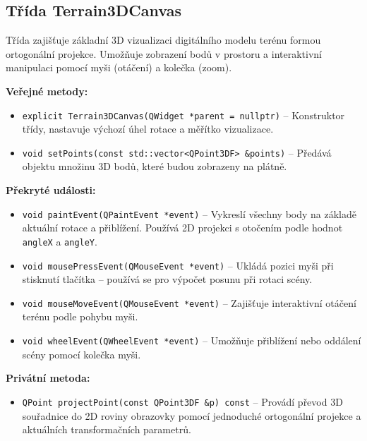 \subsection{Třída Terrain3DCanvas}
Třída zajišťuje základní 3D vizualizaci digitálního modelu terénu formou ortogonální projekce. Umožňuje zobrazení bodů v prostoru a interaktivní manipulaci pomocí myši (otáčení) a kolečka (zoom).

\textbf{Veřejné metody:}
\begin{itemize}
    \item \texttt{explicit Terrain3DCanvas(QWidget *parent = nullptr)} – Konstruktor třídy, nastavuje výchozí úhel rotace a měřítko vizualizace.
    \item \texttt{void setPoints(const std::vector<QPoint3DF> \&points)} – Předává objektu množinu 3D bodů, které budou zobrazeny na plátně.
\end{itemize}

\textbf{Překryté události:}
\begin{itemize}
    \item \texttt{void paintEvent(QPaintEvent *event)} – Vykreslí všechny body na základě aktuální rotace a přiblížení. Používá 2D projekci s otočením podle hodnot \texttt{angleX} a \texttt{angleY}.
    \item \texttt{void mousePressEvent(QMouseEvent *event)} – Ukládá pozici myši při stisknutí tlačítka – používá se pro výpočet posunu při rotaci scény.
    \item \texttt{void mouseMoveEvent(QMouseEvent *event)} – Zajišťuje interaktivní otáčení terénu podle pohybu myši.
    \item \texttt{void wheelEvent(QWheelEvent *event)} – Umožňuje přiblížení nebo oddálení scény pomocí kolečka myši.
\end{itemize}

\textbf{Privátní metoda:}
\begin{itemize}
    \item \texttt{QPoint projectPoint(const QPoint3DF \&p) const} – Provádí převod 3D souřadnice do 2D roviny obrazovky pomocí jednoduché ortogonální projekce a aktuálních transformačních parametrů.
\end{itemize}
